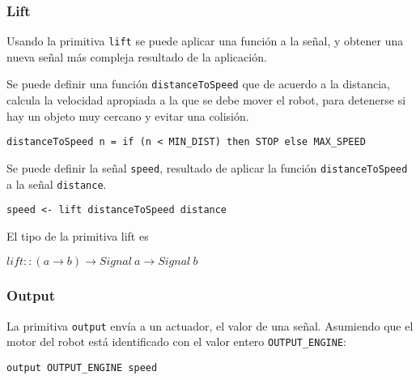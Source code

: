 \subsubsection{Lift}
  Usando la primitiva \texttt{lift} se puede aplicar una función
a la señal, y obtener una nueva señal más compleja resultado de la
aplicación.

  Se puede definir una función \texttt{distanceToSpeed} que de acuerdo
a la distancia, calcula la velocidad apropiada a la que se debe mover
el robot, para detenerse si hay un objeto muy cercano y evitar una colisión.

\begin{center}
\begin{Verbatim}[frame=single]
distanceToSpeed n = if (n < MIN_DIST) then STOP else MAX_SPEED
\end{Verbatim}
\end{center}


  Se puede definir la señal \texttt{speed}, resultado de aplicar la
función \texttt{distanceToSpeed} a la señal \texttt{distance}.

\begin{center}
\begin{Verbatim}[frame=single]
speed <- lift distanceToSpeed distance
\end{Verbatim}
\end{center}

El tipo de la primitiva lift es

\begin{center}
  $lift :: (a \rightarrow b) \rightarrow Signal\ a \rightarrow Signal\ b$
\end{center}

\subsubsection{Output}
  La primitiva \texttt{output} envía a un actuador, el valor de una señal.
  Asumiendo que el motor del robot está identificado con el valor entero
\texttt{OUTPUT\_ENGINE}:

\begin{center}
\begin{Verbatim}[frame=single]
output OUTPUT_ENGINE speed
\end{Verbatim}
\end{center}

